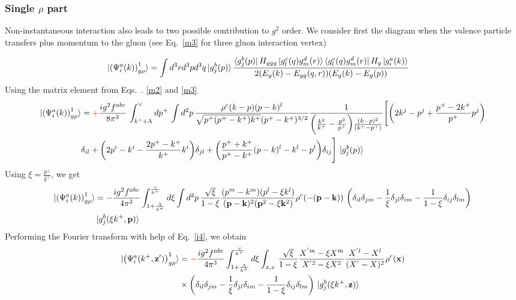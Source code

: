 \documentclass[aps,prd,amsmath,amssymb,nofootinbib]{revtex4-2}
\def\v#1{\mathbf{#1}}
\numberwithin{equation}{section}
\begin{document}
\subsubsection{Single $\rho$ part}
Non-instantaneous interaction also leads to two possible contribution to $g^2$ order. We consider first the diagram when the valence particle transfers plus momentum to the gluon 
(see Eq.~\eqref{m3} for three gluon interaction vertex)
\begin{figure}[h]
\end{figure}
\begin{align}\label{onegrho1}
  \ket{ \left(\Psi^{a}_{i}(k) \right)^{1}_{g \rho} }%
   & =
   \int d^3 r d^3p d^3q %
   \ket{g^{b}_{j}(p)}
   \frac{ \bra{g^{b}_{j}(p)}H_{ggg}\ket{g^{c}_{l}(q)g^{d}_{m}(r)}\bra{g^{c}_{l}(q)g^{d}_{m}(r)}H_{g}\ket{g^{a}_{i}(k)}}
   {2(E_{g}(k)-E_{gg}(q,r))(E_{g}(k)-E_{g}(p))}
   \end{align}
   Using the matrix element from Eqs.~. \eqref{m2} and \eqref{m3}
   \begin{align}\label{onegrho12}
\ket{ \left(\Psi^{a}_{i}(k) \right)^{1}_{g \rho} }   & = {\color{red}+}\frac{ig^{2}f^{abc}}{8\pi^{3}}\,\int_{k^{+}+\Lambda}^{\vee} dp^{+}\,\int d^{2}p\,\frac{\rho^{c}(k-p)(p-k)^{l}}{\sqrt{p^{+}(p^{+}-k^{+})k^{+}}(p^{+}-k^{+})^{3/2}} \frac{1}{\bigg(\frac{k^{2}}{k^{+}}-\frac{p^{2}}{p^{+}}\bigg)\frac{(k-p)^{2}}{(k^{+}-p^{+})}}\Bigg[\bigg(2k^{j}-p^{j}+\frac{p^{+}-2k^{+}}{p^{+}}p^{j}\bigg)\notag \\ & \delta_{il} +\bigg(2p^{i}-k^{i}-\frac{2p^{+}-k^{+}}{k^{+}}k^{i}\bigg)\delta_{jl}+\bigg(\frac{p^{+}+k^{+}}{p^{+}-k^{+}}(p-k)^{l} - k^{l} - p^{l}\bigg)\delta_{ij}\Bigg]\,\ket{g^{b}_{j}(p)}
\end{align}
Using $\xi = \frac{p^{+}}{k^{+}}$, we get
\begin{align}
 \ket{ \left(\Psi^{a}_{i}(k) \right)^{1}_{g \rho} } &  = - \frac{ig^2 f^{abc}} {4 \pi^3} 
   \int_{1+ \frac{\Lambda}{k^+}   }^{\frac{\vee}{k^+}} %
   d \xi 
   \int d^2p \,
   \frac{\sqrt{\xi}}{1-\xi} \frac{(p^m-k^m) (p^l -\xi k^l)} {(\v{p}-\v{k})^2 (\v{p}^2 - \xi \v{k}^2)}
   \rho^c(-(\v{p}-\v{k}))\,\left( 
  \delta_{il} \delta_{jm}
  - \frac{1}{\xi}\delta_{jl} \delta_{im}
  - \frac{1}{1-\xi}\delta_{ij} \delta_{lm}
   \right)\notag \\ & \ket{g^{b}_{j}(\xi k^+,\v{p})}
\end{align}
Performing the Fourier transform with help of Eq.~\eqref{i4}, we obtain
\begin{align}%
\label{Eq:onegrhoX1}
  \notag
  \ket{ \left(\Psi^{a}_{i} ( k^+, \v{z}') \right)^{1}_{g \rho} }%
   \notag
   &=
   {\color{red}-}\frac{ig^2 f^{abc}} {4 \pi^3} 
   \int_{1+ \frac{\Lambda}{k^+}   }^{\frac{\vee}{k^+}} %
   d \xi 
   \int_{x,z}\,
   \frac{\sqrt{\xi}}{1-\xi} 
   \frac{X^{'m} - \xi X^m} {X^{'2} - \xi X^2}
   \frac{X^{'l} -  X^l } {(X^{'} -  X)^2}
   \rho^c(\v{x})
  \notag \\ & \times \left( 
  \delta_{il} \delta_{jm}
  - \frac{1}{\xi}\delta_{jl} \delta_{im}
  - \frac{1}{1-\xi}\delta_{ij} \delta_{lm}
   \right)\,\ket{g^{b}_{j}(\xi k^+,\v{z})}
\end{align}
\end{document}
